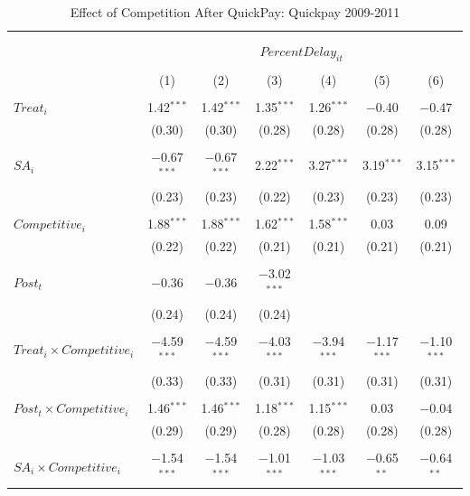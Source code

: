\documentclass[
]{article}
\begin{document}
\begin{table}[H] \centering 
  \caption{Effect of Competition After QuickPay: Quickpay 2009-2011} 
  \label{} 
\small 
\begin{tabular}{@{\extracolsep{-3pt}}lcccccc} 
\\[-1.8ex]\hline 
\hline \\[-1.8ex] 
\\[-1.8ex] & \multicolumn{6}{c}{$PercentDelay_{it}$  } \\ 
\\[-1.8ex] & (1) & (2) & (3) & (4) & (5) & (6)\\ 
\hline \\[-1.8ex] 
 $Treat_i$ & 1.42$^{***}$ & 1.42$^{***}$ & 1.35$^{***}$ & 1.26$^{***}$ & $-$0.40 & $-$0.47 \\ 
  & (0.30) & (0.30) & (0.28) & (0.28) & (0.28) & (0.28) \\ 
  & & & & & & \\ 
 $SA_i$ & $-$0.67$^{***}$ & $-$0.67$^{***}$ & 2.22$^{***}$ & 3.27$^{***}$ & 3.19$^{***}$ & 3.15$^{***}$ \\ 
  & (0.23) & (0.23) & (0.22) & (0.23) & (0.23) & (0.23) \\ 
  & & & & & & \\ 
 $Competitive_i$ & 1.88$^{***}$ & 1.88$^{***}$ & 1.62$^{***}$ & 1.58$^{***}$ & 0.03 & 0.09 \\ 
  & (0.22) & (0.22) & (0.21) & (0.21) & (0.21) & (0.21) \\ 
  & & & & & & \\ 
 $Post_t$ & $-$0.36 & $-$0.36 & $-$3.02$^{***}$ &  &  &  \\ 
  & (0.24) & (0.24) & (0.24) &  &  &  \\ 
  & & & & & & \\ 
 $Treat_i \times Competitive_i$ & $-$4.59$^{***}$ & $-$4.59$^{***}$ & $-$4.03$^{***}$ & $-$3.94$^{***}$ & $-$1.17$^{***}$ & $-$1.10$^{***}$ \\ 
  & (0.33) & (0.33) & (0.31) & (0.31) & (0.31) & (0.31) \\ 
  & & & & & & \\ 
 $Post_t \times Competitive_i$ & 1.46$^{***}$ & 1.46$^{***}$ & 1.18$^{***}$ & 1.15$^{***}$ & 0.03 & $-$0.04 \\ 
  & (0.29) & (0.29) & (0.28) & (0.28) & (0.28) & (0.28) \\ 
  & & & & & & \\ 
 $SA_i \times Competitive_i$ & $-$1.54$^{***}$ & $-$1.54$^{***}$ & $-$1.01$^{***}$ & $-$1.03$^{***}$ & $-$0.65$^{**}$ & $-$0.64$^{**}$ \\ 

\end{tabular}
\end{table}
\end{document}
